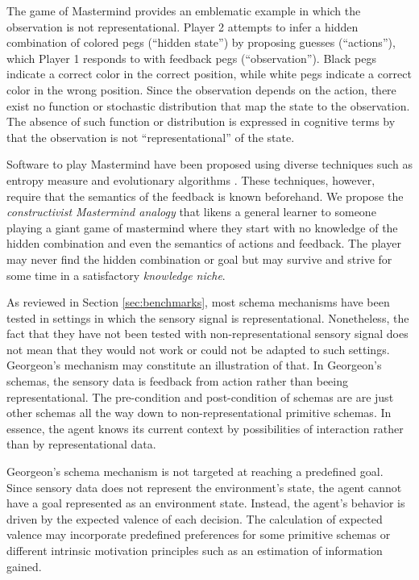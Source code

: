 \documentclass[runningheads]{llncs}
\begin{document}
The game of Mastermind provides an emblematic example in which the observation is not representational. 
Player 2 attempts to infer a hidden combination of colored pegs (``hidden state'') by proposing guesses (``actions''), which Player 1 responds to with feedback pegs (``observation''). Black pegs indicate a correct color in the correct position, while white pegs indicate a correct color in the wrong position.
Since the observation depends on the action, there exist no function or stochastic distribution that map the state to the observation. 
The absence of such function or distribution is expressed in cognitive terms by that the observation is not ``representational'' of the state.

Software to play Mastermind have been proposed using diverse techniques such as entropy measure and evolutionary algorithms \cite{cotta_entropy-driven_2010}.
These techniques, however, require that the semantics of the feedback is known beforehand. 
We propose the \textit{constructivist Mastermind analogy} that likens a general learner to someone playing a giant game of mastermind where they start with no knowledge of the hidden combination and even the semantics of actions and feedback.
The player may never find the hidden combination or goal but may survive and strive for some time in a satisfactory \textit{knowledge niche}.

As reviewed in Section \ref{sec:benchmarks}, most schema mechanisms have been tested in settings in which the sensory signal is representational.
Nonetheless, the fact that they have not been tested with non-representational sensory signal does not mean that they would not work or could not be adapted to such settings. 
Georgeon's mechanism may constitute an illustration of that.  
In Georgeon's schemas, the sensory data is feedback from action rather than beeing representational. 
The pre-condition and post-condition of schemas are are just other schemas all the way down to non-representational primitive schemas. 
In essence, the agent knows its current context by possibilities of interaction rather than by representational data. 

Georgeon's schema mechanism is not targeted at reaching a predefined goal. Since sensory data does not represent the environment's state, the agent cannot have a goal represented as an environment state. Instead, the agent's behavior is driven by the expected valence of each decision. 
The calculation of expected valence may incorporate predefined preferences for some primitive schemas or different intrinsic motivation principles such as an estimation of information gained. 
\end{document}
